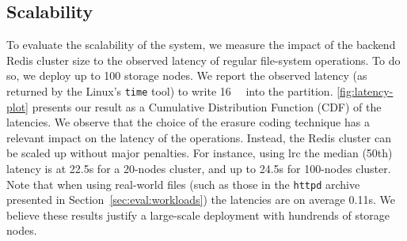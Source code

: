 %

\subsection{Scalability}
\label{subsec:latency}

To evaluate the scalability of the system, we measure the impact of the backend Redis cluster size to the observed latency of regular file-system operations.
To do so, we deploy up to 100 storage nodes.
We report the observed latency (as returned by the Linux's \texttt{time} tool) to write \SI{16}{\mebi\byte} into the \SYS partition.
\autoref{fig:latency-plot} presents our result as a Cumulative Distribution Function (CDF) of the latencies.
We observe that the choice of the erasure coding technique has a relevant impact on the latency of the operations. 
Instead, the Redis cluster can be scaled up without major penalties.
For instance, using \ac{lrc} the median (50th) latency is at 22.5s for a 20-nodes cluster, and up to 24.5s for 100-nodes cluster. 
Note that when using real-world files (such as those in the \texttt{httpd} archive presented in Section~\ref{sec:eval:workloads}) the latencies are on average 0.11s. 
We believe these results justify a large-scale deployment with hundrends of storage nodes. 

